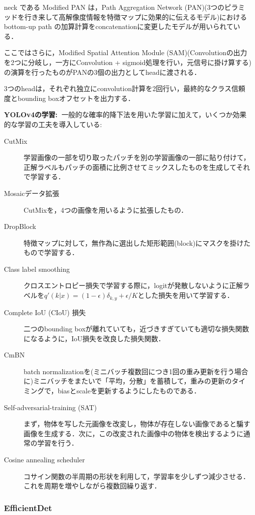 \documentclass[originalpaper]{jsaiart}     %
\begin{document}
neck である Modified PAN は，Path Aggregation Network (PAN)(3つのピラミッドを行き来して高解像度情報を特徴マップに効果的に伝えるモデル)におけるbottom-up path の加算計算をconcatenationに変更したモデルが用いられている．

ここではさらに，Modified Spatial Attention Module (SAM)(Convolutionの出力を2つに分岐し，一方にConvolution + sigmoid処理を行い，元信号に掛け算する)の演算を行ったものがPANの3個の出力としてheadに渡される．

3つのheadは，それぞれ独立にconvolution計算を2回行い，最終的なクラス信頼度とbounding boxオフセットを出力する．

{\bf YOLOv4の学習:\ }一般的な確率的降下法を用いた学習に加えて，いくつか効果的な学習の工夫を導入している: 

\begin{description}
    \item[CutMix] 学習画像の一部を切り取ったパッチを別の学習画像の一部に貼り付けて，正解ラベルもパッチの面積に比例させてミックスしたものを生成してそれで学習する．
    \item[Mosaicデータ拡張] CutMixを，4つの画像を用いるように拡張したもの．
    \item[DropBlock] 特徴マップに対して，無作為に選出した矩形範囲(block)にマスクを掛けたもので学習する．
    \item[Class label smoothing] クロスエントロピー損失で学習する際に，logitが発散しないように正解ラベルを$q'(k|x)=(1-\epsilon)\delta_{k,y}+\epsilon/K$とした損失を用いて学習する．
    \item[Complete IoU (CIoU) 損失] 二つのbounding boxが離れていても，近づきすぎていても適切な損失関数になるように，IoU損失を改良した損失関数．
    \item[CmBN] batch normalizationを(ミニバッチ複数回につき1回の重み更新を行う場合に)ミニバッチをまたいで「平均，分散」を蓄積して，重みの更新のタイミングで，biasとscaleを更新するようにしたものである．
    \item[Self-adversarial-training (SAT)] まず，物体を写した元画像を改変し，物体が存在しない画像であると騙す画像を生成する．次に，この改変された画像中の物体を検出するように通常の学習を行う．
    \item[Cosine annealing scheduler] コサイン関数の半周期の形状を利用して，学習率を少しずつ減少させる．これを周期を増やしながら複数回繰り返す．
\end{description}
\subsubsection{EfficientDet}
\end{document}
